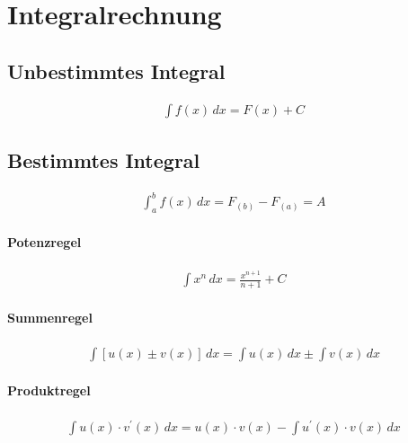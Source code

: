 \pagebreak

\section{Integralrechnung}

\subsection{Unbestimmtes Integral}

\begin{align*}
   \int f(x) \,dx = F(x) + C
\end{align*}

\subsection{Bestimmtes Integral}

\begin{align*}
   \int_{a}^{b} f(x) \,dx = F_{(b)} -F_{(a)} = A
\end{align*}


\paragraph{Potenzregel}
\begin{align*}
   \int x^n \,dx = \frac{x^{n+1}}{n+1} + C
\end{align*}
\paragraph{Summenregel}
\begin{align*}
   \int [u(x) \pm v(x)] \,dx = \int u(x) \,dx \pm \int v(x) \,dx
\end{align*}
\paragraph{Produktregel}
\begin{align*}
   \int u(x) \cdot v^{\prime}(x) \,dx = u(x) \cdot v(x) - \int u^{\prime}(x) \cdot v(x) \,dx
\end{align*}

